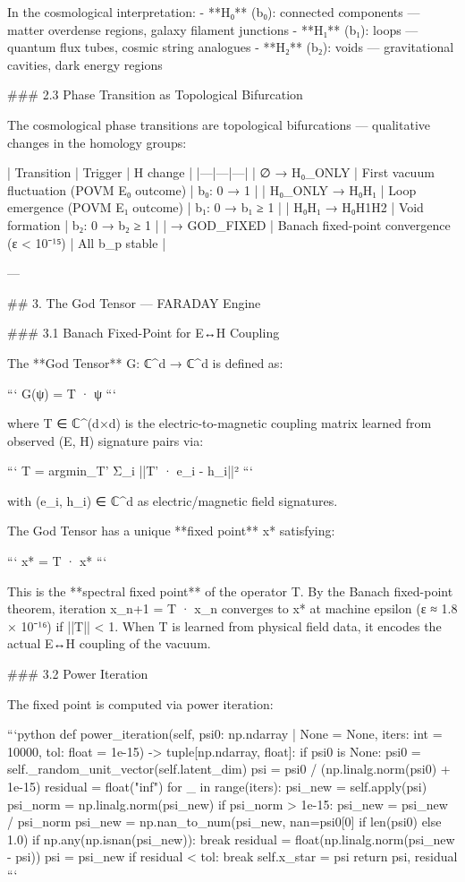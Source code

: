 In the cosmological interpretation:
- **H₀** (b₀): connected components — matter overdense regions, galaxy filament junctions
- **H₁** (b₁): loops — quantum flux tubes, cosmic string analogues
- **H₂** (b₂): voids — gravitational cavities, dark energy regions

### 2.3 Phase Transition as Topological Bifurcation

The cosmological phase transitions are topological bifurcations — qualitative changes in the homology groups:

| Transition | Trigger | H change |
|---|---|---|
| ∅ → H₀_ONLY | First vacuum fluctuation (POVM E₀ outcome) | b₀: 0 → 1 |
| H₀_ONLY → H₀H₁ | Loop emergence (POVM E₁ outcome) | b₁: 0 → b₁ ≥ 1 |
| H₀H₁ → H₀H1H2 | Void formation | b₂: 0 → b₂ ≥ 1 |
| → GOD_FIXED | Banach fixed-point convergence (ε < 10⁻¹⁵) | All b_p stable |

---

## 3. The God Tensor — FARADAY Engine

### 3.1 Banach Fixed-Point for E↔H Coupling

The **God Tensor** G: ℂ^d → ℂ^d is defined as:

```
G(ψ) = T · ψ
```

where T ∈ ℂ^(d×d) is the electric-to-magnetic coupling matrix learned from observed (E, H) signature pairs via:

```
T = argmin_{T'} Σ_i ||T' · e_i - h_i||²
```

with (e_i, h_i) ∈ ℂ^d as electric/magnetic field signatures.

The God Tensor has a unique **fixed point** x* satisfying:

```
x* = T · x*
```

This is the **spectral fixed point** of the operator T.  By the Banach fixed-point theorem, iteration x_{n+1} = T · x_n converges to x* at machine epsilon (ε ≈ 1.8 × 10⁻¹⁶) if ||T|| < 1.  When T is learned from physical field data, it encodes the actual E↔H coupling of the vacuum.

### 3.2 Power Iteration

The fixed point is computed via power iteration:

```python
def power_iteration(self, psi0: np.ndarray | None = None, iters: int = 10000, tol: float = 1e-15) -> tuple[np.ndarray, float]:
    if psi0 is None:
        psi0 = self._random_unit_vector(self.latent_dim)
    psi = psi0 / (np.linalg.norm(psi0) + 1e-15)
    residual = float("inf")
    for _ in range(iters):
        psi_new = self.apply(psi)
        psi_norm = np.linalg.norm(psi_new)
        if psi_norm > 1e-15:
            psi_new = psi_new / psi_norm
        psi_new = np.nan_to_num(psi_new, nan=psi0[0] if len(psi0) else 1.0)
        if np.any(np.isnan(psi_new)):
            break
        residual = float(np.linalg.norm(psi_new - psi))
        psi = psi_new
        if residual < tol:
            break
    self.x_star = psi
    return psi, residual
```

